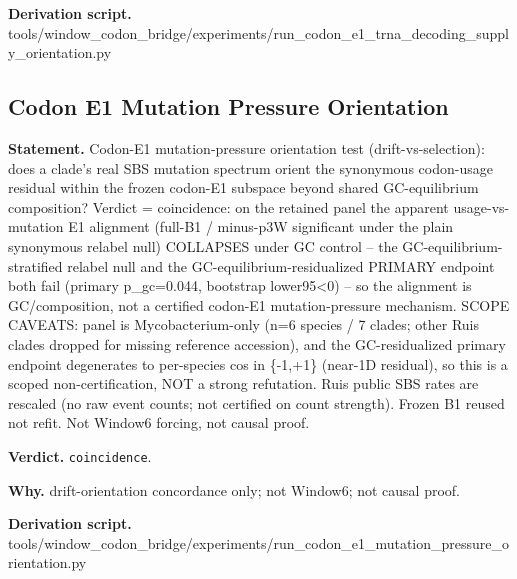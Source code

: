 \textbf{Derivation script.} tools/window\_codon\_bridge/experiments/run\_codon\_e1\_trna\_decoding\_supply\_orientation.py

\subsection{Codon E1 Mutation Pressure Orientation}\label{sec:bridge-codon-e1-mutation-pressure-orientation}
\textbf{Statement.} Codon-E1 mutation-pressure orientation test (drift-vs-selection): does a clade's real SBS mutation
spectrum orient the synonymous codon-usage residual within the frozen codon-E1 subspace beyond
shared GC-equilibrium composition? Verdict = coincidence: on the retained panel the apparent
usage-vs-mutation E1 alignment (full-B1 / minus-p3W significant under the plain synonymous relabel
null) COLLAPSES under GC control -- the GC-equilibrium-stratified relabel null and the
GC-equilibrium-residualized PRIMARY endpoint both fail (primary p\_gc=0.044, bootstrap lower95<0) --
so the alignment is GC/composition, not a certified codon-E1 mutation-pressure mechanism. SCOPE
CAVEATS: panel is Mycobacterium-only (n=6 species / 7 clades; other Ruis clades dropped for missing
reference accession), and the GC-residualized primary endpoint degenerates to per-species cos in
\{-1,+1\} (near-1D residual), so this is a scoped non-certification, NOT a strong refutation. Ruis
public SBS rates are rescaled (no raw event counts; not certified on count strength). Frozen B1
reused not refit. Not Window6 forcing, not causal proof.

\textbf{Verdict.} \texttt{coincidence}.

\textbf{Why.} drift-orientation concordance only; not Window6; not causal proof.

\textbf{Derivation script.} tools/window\_codon\_bridge/experiments/run\_codon\_e1\_mutation\_pressure\_orientation.py

